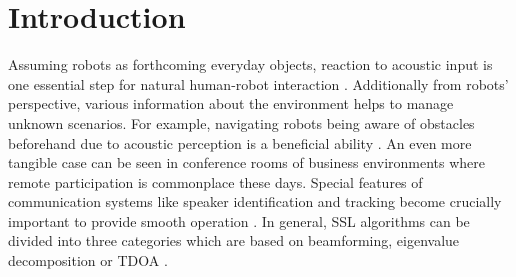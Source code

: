 \chapter{Introduction}
\label{chap:01_introduction}



Assuming robots as forthcoming everyday objects, reaction to acoustic
input is one essential step for natural human-robot interaction \cite{audio_loca_robotics,socially_interactive_robots}.
Additionally from robots' perspective, various information about the environment
helps to manage unknown scenarios.
For example, navigating robots being aware of obstacles beforehand
due to acoustic perception is a beneficial ability \cite{robust_localization_sources}.
An even more tangible case can be seen in conference rooms of business environments
where remote participation is commonplace these days.
Special features of communication systems like speaker identification and tracking
become crucially important to provide smooth operation \cite{Brandstein96apractical}.
In general, \ac{SSL} algorithms can be divided into three categories
which are based on beamforming, eigenvalue
decomposition or \ac{TDOA} \cite{Brandstein96apractical,gcc_time_broeck,benesty_passive_acoustic}.

